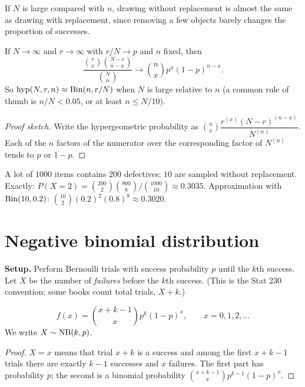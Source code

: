 If $N$ is large compared with $n$, drawing without replacement is almost the same as
drawing with replacement, since removing a few objects barely changes the proportion of
successes.

\begin{theorem}
If $N\to\infty$ and $r\to\infty$ with $r/N \to p$ and $n$ fixed, then
\[
  \frac{\binom{r}{x}\binom{N-r}{n-x}}{\binom{N}{n}} \to \binom{n}{x}p^x(1-p)^{n-x}.
\]
So $\operatorname{hyp}(N,r,n) \approx \operatorname{Bin}(n, r/N)$ when $N$ is large relative to $n$ (a common rule of
thumb is $n/N < 0.05$, or at least $n \le N/10$).
\end{theorem}

\begin{proof}[Proof sketch]
Write the hypergeometric probability as
$\binom nx \dfrac{r^{(x)}(N-r)^{(n-x)}}{N^{(n)}}$. Each of the $n$ factors of the
numerator over the corresponding factor of $N^{(n)}$ tends to $p$ or $1-p$.
\end{proof}

\begin{example}
A lot of $1000$ items contains $200$ defectives; $10$ are sampled without replacement.
Exactly: $P(X=2) = \binom{200}{2}\binom{800}{8}/\binom{1000}{10} \approx 0.3035$.
Approximation with $\operatorname{Bin}(10, 0.2)$: $\binom{10}2(0.2)^2(0.8)^8 \approx 0.3020$.
\end{example}

\section{Negative binomial distribution}

\textbf{Setup.} Perform Bernoulli trials with success probability $p$ until the $k$th
success. Let $X$ be the number of \emph{failures} before the $k$th success. (This is the
Stat 230 convention; some books count total trials, $X+k$.)

\begin{theorem}
\[
  f(x) = \binom{x+k-1}{x} p^k (1-p)^x, \qquad x = 0,1,2,\dots
\]
We write $X\sim\operatorname{NB}(k,p)$.
\end{theorem}

\begin{proof}
$X = x$ means that trial $x+k$ is a success and among the first $x+k-1$ trials there are
exactly $k-1$ successes and $x$ failures. The first part has probability $p$; the second
is a binomial probability $\binom{x+k-1}{x}p^{k-1}(1-p)^x$.
\end{proof}

